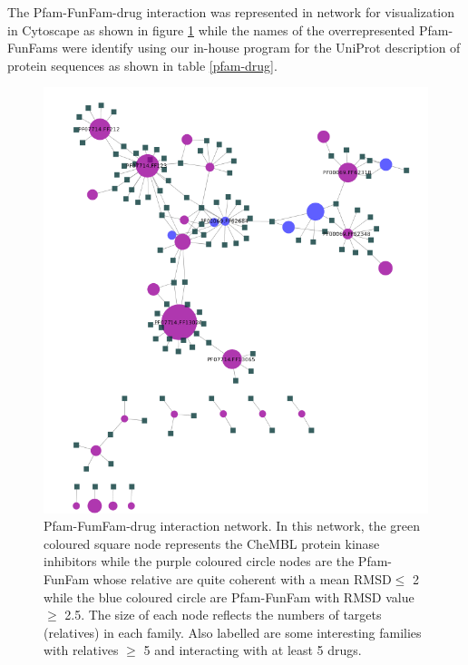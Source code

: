 \documentclass[a4paper, 11pt]{article}
\begin{document}
The Pfam-FunFam-drug interaction was represented in network for visualization in Cytoscape as shown in figure \ref{pfam-chembl} while the names of the overrepresented Pfam-FunFams were identify using our in-house program for the UniProt description  of protein sequences as shown in table \ref{pfam-drug}.
\begin{figure}[H]
	\includegraphics[width=.9\linewidth]{figures/pfam_chembl.png}
	\centering
	\caption{Pfam-FumFam-drug interaction network. In this network, the green coloured square node represents the CheMBL protein kinase inhibitors while the purple coloured circle nodes are the Pfam-FunFam whose relative are quite coherent with a mean RMSD$\leq$ 2 while the blue coloured circle are Pfam-FunFam with RMSD value $\geq$ 2.5. The size of each node reflects the numbers of targets (relatives) in each family. Also labelled are some interesting families with relatives  $\geq$ 5 and interacting with at least 5 drugs.}
	\label{pfam-chembl}
\end{figure}
\end{document}
